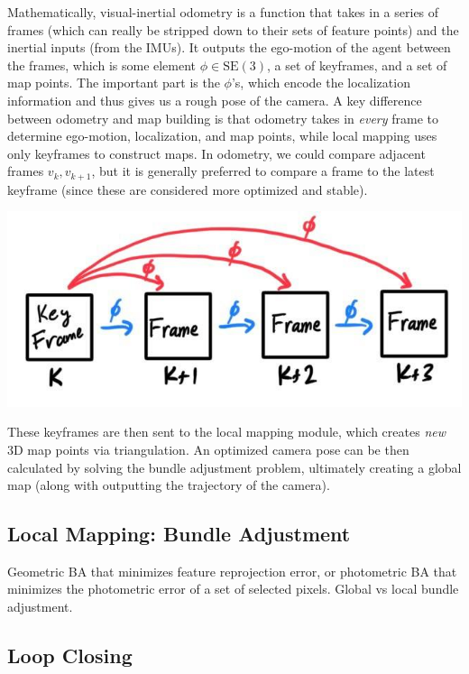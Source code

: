 \documentclass{article}
\theoremstyle{definition}
\theoremstyle{remark}
\theoremstyle{definition}
\begin{document}
Mathematically, visual-inertial odometry is a function that takes in a series of frames (which can really be stripped down to their sets of feature points) and the inertial inputs (from the IMUs). It outputs the ego-motion of the agent between the frames, which is some element $\phi \in \mathrm{SE}(3)$, a set of keyframes, and a set of map points. The important part is the $\phi$'s, which encode the localization information and thus gives us a rough pose of the camera. 
A key difference between odometry and map building is that odometry takes in \textit{every} frame to determine ego-motion, localization, and map points, while local mapping uses only keyframes to construct maps. In odometry, we could compare adjacent frames $v_{k}, v_{k+1}$, but it is generally preferred to compare a frame to the latest keyframe (since these are considered more optimized and stable). 
\begin{center}
    \includegraphics[scale=0.3]{img/VO_comparison.jpg}
\end{center}
These keyframes are then sent to the local mapping module, which creates \textit{new} 3D map points via triangulation. An optimized camera pose can be then calculated by solving the bundle adjustment problem, ultimately creating a global map (along with outputting the trajectory of the camera). 

\subsection{Local Mapping: Bundle Adjustment}

Geometric BA that minimizes feature reprojection error, or photometric BA that minimizes the photometric error of a set of selected pixels. Global vs local bundle adjustment. 

\subsection{Loop Closing}
\end{document}

